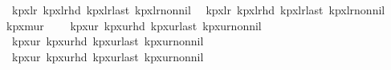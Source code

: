 \begin{isabellebody}
\ \ kp{\isacharunderscore}{\kern0pt}{}x{}{\isacharunderscore}{\kern0pt}lr\ kp{\isacharunderscore}{\kern0pt}{}x{}{\isacharunderscore}{\kern0pt}lr{\isacharunderscore}{\kern0pt}hd\ kp{\isacharunderscore}{\kern0pt}{}x{}{\isacharunderscore}{\kern0pt}lr{\isacharunderscore}{\kern0pt}last\ kp{\isacharunderscore}{\kern0pt}{}x{}{\isacharunderscore}{\kern0pt}lr{\isacharunderscore}{\kern0pt}non{\isacharunderscore}{\kern0pt}nil\isanewline
\ \ kp{\isacharunderscore}{\kern0pt}{}x{}{\isacharunderscore}{\kern0pt}lr\ kp{\isacharunderscore}{\kern0pt}{}x{}{\isacharunderscore}{\kern0pt}lr{\isacharunderscore}{\kern0pt}hd\ kp{\isacharunderscore}{\kern0pt}{}x{}{\isacharunderscore}{\kern0pt}lr{\isacharunderscore}{\kern0pt}last\ kp{\isacharunderscore}{\kern0pt}{}x{}{\isacharunderscore}{\kern0pt}lr{\isacharunderscore}{\kern0pt}non{\isacharunderscore}{\kern0pt}nil\isanewline
\isanewline
{}\isamarkupfalse%
\ kp{\isacharunderscore}{\kern0pt}{}xm{\isacharunderscore}{\kern0pt}ur\ {\isacharequal}{\kern0pt}\ \isanewline
\ \ kp{\isacharunderscore}{\kern0pt}{}x{}{\isacharunderscore}{\kern0pt}ur\ kp{\isacharunderscore}{\kern0pt}{}x{}{\isacharunderscore}{\kern0pt}ur{\isacharunderscore}{\kern0pt}hd\ kp{\isacharunderscore}{\kern0pt}{}x{}{\isacharunderscore}{\kern0pt}ur{\isacharunderscore}{\kern0pt}last\ kp{\isacharunderscore}{\kern0pt}{}x{}{\isacharunderscore}{\kern0pt}ur{\isacharunderscore}{\kern0pt}non{\isacharunderscore}{\kern0pt}nil\isanewline
\ \ kp{\isacharunderscore}{\kern0pt}{}x{}{\isacharunderscore}{\kern0pt}ur\ kp{\isacharunderscore}{\kern0pt}{}x{}{\isacharunderscore}{\kern0pt}ur{\isacharunderscore}{\kern0pt}hd\ kp{\isacharunderscore}{\kern0pt}{}x{}{\isacharunderscore}{\kern0pt}ur{\isacharunderscore}{\kern0pt}last\ kp{\isacharunderscore}{\kern0pt}{}x{}{\isacharunderscore}{\kern0pt}ur{\isacharunderscore}{\kern0pt}non{\isacharunderscore}{\kern0pt}nil\isanewline
\ \ kp{\isacharunderscore}{\kern0pt}{}x{}{\isacharunderscore}{\kern0pt}ur\ kp{\isacharunderscore}{\kern0pt}{}x{}{\isacharunderscore}{\kern0pt}ur{\isacharunderscore}{\kern0pt}hd\ kp{\isacharunderscore}{\kern0pt}{}x{}{\isacharunderscore}{\kern0pt}ur{\isacharunderscore}{\kern0pt}last\ kp{\isacharunderscore}{\kern0pt}{}x{}{\isacharunderscore}{\kern0pt}ur{\isacharunderscore}{\kern0pt}non{\isacharunderscore}{\kern0pt}nil\isanewline

\end{isabellebody}
